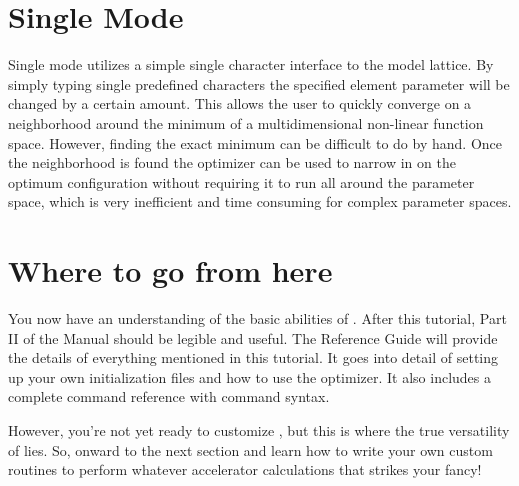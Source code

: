 
\section{Single Mode}
\label{s:single_mode}

Single mode utilizes a simple single character interface to the \tao
model lattice.  By simply typing single predefined characters the
specified element parameter will be changed by a certain amount. This
allows the user to quickly converge on a neighborhood around the
minimum of a multidimensional non-linear function space. However,
finding the exact minimum can be difficult to do by hand. Once the
neighborhood is found the optimizer can be used to narrow in on the
optimum configuration without requiring it to run all around the
parameter space, which is very inefficient and time consuming for
complex parameter spaces.


\section{Where to go from here}
\label{s:where_to_go}

You now have an understanding of the basic abilities of \tao. After
this tutorial, Part II of the \tao Manual should be legible and
useful.  The Reference Guide will provide the details of everything
mentioned in this tutorial.  It goes into detail of setting up your
own initialization files and how to use the optimizer. It also
includes a complete command reference with command syntax.

However, you're not yet ready to customize \tao, but this is where the
true versatility of \tao lies. So, onward to the next section and
learn how to write your own custom routines to perform whatever
accelerator calculations that strikes your fancy!

